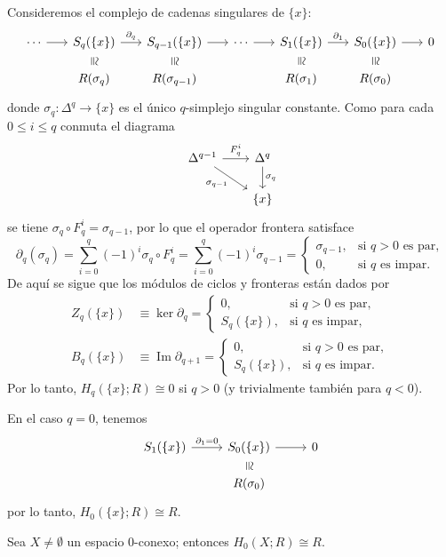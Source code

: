 \begin{dem}
Consideremos el complejo de cadenas singulares de $\{x\}$:
\[
\begin{tikzcd}[column sep=1.7em, row sep=1.2em]
\cdots \arrow[r] & S_q(\{x\}) \arrow[r, "\partial_q"] \arrow[d, phantom, "\cong"{description, sloped, inner sep=1pt}] & S_{q-1}(\{x\}) \arrow[r] \arrow[d, phantom, "\cong"{description, sloped, inner sep=1pt}] & \cdots \arrow[r] & S_1(\{x\}) \arrow[r, "\partial_1"] \arrow[d, phantom, "\cong"{description, sloped, inner sep=1pt}] & S_0(\{x\}) \arrow[r] \arrow[d, phantom, "\cong"{description, sloped, inner sep=1pt}] & 0 \\
& R(\sigma_q) & R(\sigma_{q-1}) & & R(\sigma_1) & R(\sigma_0) &
\end{tikzcd}
\]
donde $\sigma_q \colon \Delta^q \to \{x\}$ es el único $q$-simplejo singular constante. Como para cada $0 \leq i \leq q$ conmuta el diagrama
\[
\begin{tikzcd}[column sep=2em, row sep=1.8em]
\Delta^{q-1} \arrow[r, "F_q^i"] \arrow[dr, "\sigma_{q-1}"'] & \Delta^q \arrow[d, "\sigma_q"] \\
& \{x\}
\end{tikzcd}
\]
se tiene $\sigma_q \circ F_q^i = \sigma_{q-1}$, por lo que el operador frontera satisface
\[
\partial_q(\sigma_q) = \sum_{i=0}^q (-1)^i \sigma_q \circ F_q^i = \sum_{i=0}^q (-1)^i \sigma_{q-1} =
\begin{cases}
    \sigma_{q-1}, & \text{si } q > 0 \text{ es par}, \\
    0, & \text{si } q \text{ es impar}.
\end{cases}
\]
De aquí se sigue que los módulos de ciclos y fronteras están dados por
\begin{align*}
Z_q(\{x\}) &\equiv \ker \partial_q =
\begin{cases}
    0, & \text{si } q > 0 \text{ es par}, \\
    S_q(\{x\}), & \text{si } q \text{ es impar},
\end{cases} \\[1ex]
B_q(\{x\}) &\equiv \operatorname{Im} \partial_{q+1} =
\begin{cases}
    0, & \text{si } q > 0 \text{ es par}, \\
    S_q(\{x\}), & \text{si } q \text{ es impar}.
\end{cases}
\end{align*}
Por lo tanto, $H_q(\{x\}; R) \cong 0$ si $q > 0$ (y trivialmente también para $q < 0$).

En el caso $q = 0$, tenemos
\[
\begin{tikzcd}[column sep=2.5em, row sep=1.2em]
S_1(\{x\}) \arrow[r, "\partial_1 = 0"] & S_0(\{x\}) \arrow[r] \arrow[d, phantom, "\cong"{description, sloped, inner sep=1pt}] & 0 \\
& R(\sigma_0) &
\end{tikzcd}
\]
por lo tanto, $H_0(\{x\}; R) \cong R$.
\end{dem}
\begin{prop}
Sea $X \neq \emptyset$ un espacio $0$-conexo; entonces $H_0(X; R) \cong R$.
\end{prop}

